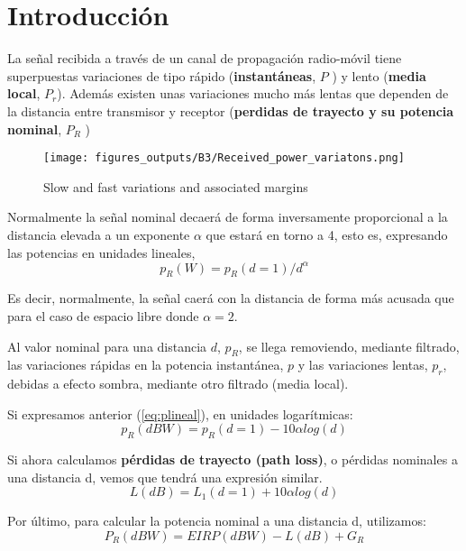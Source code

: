 \documentclass{article}
\begin{document}
\section{Introducción}
    \par La señal recibida a través de un canal de propagación radio-móvil tiene superpuestas variaciones de tipo rápido (\textbf{instantáneas}, \(P\) ) y lento (\textbf{media local}, \(P_r\)). Además existen unas variaciones mucho más lentas que dependen de la distancia entre transmisor y receptor (\textbf{perdidas de trayecto y su potencia nominal}, \(P_R\) )
    \begin{figure}[h]
        \centering
        \texttt{[image: figures\_outputs/B3/Received\_power\_variatons.png]}
        \caption{Slow and fast variations and associated margins}
        \label{fig:my_label}
    \end{figure}
    \par Normalmente la señal nominal decaerá de forma inversamente proporcional a la distancia elevada a un exponente \( \alpha \) que estará en torno a 4, esto es, expresando las potencias en unidades lineales,
    \begin{equation}
        \tag{Potencia en unidades lineales}
        p_R(W) = p_R(d=1)/d^\alpha
        \label{eq:plineal}
    \end{equation}
    \par Es decir, normalmente, la señal caerá con la distancia de forma más acusada que para el caso de espacio libre donde \( \alpha = 2\).
    \par Al valor nominal para una distancia \(d\), \(p_R\), se llega removiendo, mediante filtrado, las variaciones rápidas en la potencia instantánea, \(p\) y las variaciones lentas, \(p_r \), debidas a efecto sombra, mediante otro filtrado (media local).
    \par Si expresamos anterior (\ref{eq:plineal}), en unidades logarítmicas:
    \begin{equation}
         \tag{Potencia en unidades logarítmicas}
        p_R(dBW) = p_R(d=1) - 10\alpha log(d)
        \label{eq:plog}
    \end{equation}
    \par Si ahora calculamos \textbf{pérdidas de trayecto (path loss)}, o pérdidas nominales a una distancia d, vemos que tendrá una expresión similar.
    \begin{equation}
         \tag{Path loss}
        L(dB) = L_1(d=1) + 10\alpha log(d)
        \label{eq:pathloss}
    \end{equation}
    \par Por último, para calcular la potencia nominal a una distancia d, utilizamos:
    \begin{equation}
         \tag{Potencia nominal a una distancia d}
        P_R(dBW) = EIRP(dBW) - L(dB) + G_R
        \label{eq:pnominal}
    \end{equation}
\end{document}
